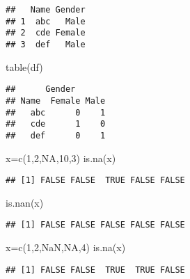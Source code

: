\documentclass[
]{article}
\newenvironment{Shaded}{\begin{snugshade}}{\end{snugshade}}
\newcommand{\ConstantTok}[1]{\textcolor[rgb]{0.00,0.00,0.00}{#1}}
\newcommand{\DecValTok}[1]{\textcolor[rgb]{0.00,0.00,0.81}{#1}}
\newcommand{\FunctionTok}[1]{\textcolor[rgb]{0.00,0.00,0.00}{#1}}
\newcommand{\NormalTok}[1]{#1}
\newcommand{\OtherTok}[1]{\textcolor[rgb]{0.56,0.35,0.01}{#1}}
\begin{document}
\begin{verbatim}
##   Name Gender
## 1  abc   Male
## 2  cde Female
## 3  def   Male
\end{verbatim}

\begin{Shaded}
\begin{Highlighting}[]
\FunctionTok{table}\NormalTok{(df)}
\end{Highlighting}
\end{Shaded}

\begin{verbatim}
##      Gender
## Name  Female Male
##   abc      0    1
##   cde      1    0
##   def      0    1
\end{verbatim}

\begin{Shaded}
\begin{Highlighting}[]
\NormalTok{x}\OtherTok{=}\FunctionTok{c}\NormalTok{(}\DecValTok{1}\NormalTok{,}\DecValTok{2}\NormalTok{,}\ConstantTok{NA}\NormalTok{,}\DecValTok{10}\NormalTok{,}\DecValTok{3}\NormalTok{)}
\FunctionTok{is.na}\NormalTok{(x)}
\end{Highlighting}
\end{Shaded}

\begin{verbatim}
## [1] FALSE FALSE  TRUE FALSE FALSE
\end{verbatim}

\begin{Shaded}
\begin{Highlighting}[]
\FunctionTok{is.nan}\NormalTok{(x)}
\end{Highlighting}
\end{Shaded}

\begin{verbatim}
## [1] FALSE FALSE FALSE FALSE FALSE
\end{verbatim}

\begin{Shaded}
\begin{Highlighting}[]
\NormalTok{x}\OtherTok{=}\FunctionTok{c}\NormalTok{(}\DecValTok{1}\NormalTok{,}\DecValTok{2}\NormalTok{,}\ConstantTok{NaN}\NormalTok{,}\ConstantTok{NA}\NormalTok{,}\DecValTok{4}\NormalTok{)}
\FunctionTok{is.na}\NormalTok{(x)}
\end{Highlighting}
\end{Shaded}

\begin{verbatim}
## [1] FALSE FALSE  TRUE  TRUE FALSE
\end{verbatim}
\end{document}
